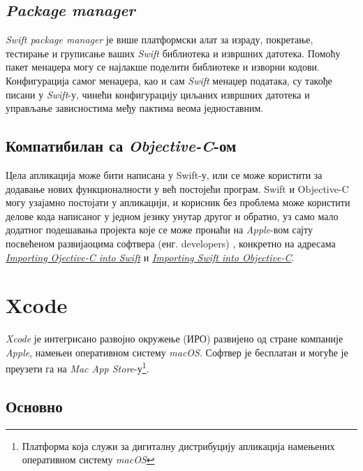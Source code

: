 \documentclass[12pt,oneside]{memoir}
\begin{document}
\subsection{\textit{Package manager}}

\textit{Swift package manager} је више платформски алат за израду, покретање, тестирање и груписање ваших \textit{Swift} библиотека и извршних датотека. Помоћу пакет менаџера могу се најлакше поделити библиотеке и изворни кодови. Конфигурација самог менаџера, као и сам \textit{Swift} менаџер података, су такође писани у \textit{Swift}-у, чинећи конфигурацију циљаних извршних датотека и управљање зависностима међу пактима веома једноставним. 

\subsection{Компатибилан са \textit{Objective-C}-ом}

Цела апликација може бити написана у Swift-у, или се може користити за додавање нових функционалности у већ постојећи програм. Swift и Objective-C могу узајамно постојати у апликацији, и корисник без проблема може користити делове кода написаног у једном језику унутар другог и обратно, уз само мало додатног подешавања пројекта које се може пронаћи на \textit{Apple}-вом сајту посвећеном развијаоцима софтвера (енг. developers) \cite{Apple_Developer}, конкретно на адресама \href{https://developer.apple.com/documentation/swift/imported_c_and_objective-c_apis/importing_objective-c_into_swift}{\textit{Importing Ojective-C into Swift}} и \href{https://developer.apple.com/documentation/swift/imported_c_and_objective-c_apis/importing_swift_into_objective-c}{\textit{Importing Swift into Objective-C}}.

\section{Xcode}
\label{sec:Xcode}

\indent \textit{Xcode} је интегрисано развојно окружење (ИРО) развијено од стране компаније \textit{Apple}, намењен оперативном систему \textit{macOS}. Софтвер је бесплатан и могуће је преузети га на \textit{Mac App Store}-у\footnote{Платформа која служи за дигиталну дистрибуцију апликација намењених оперативном систему \textit{macOS}}.

\subsection{Основно}
\end{document}
